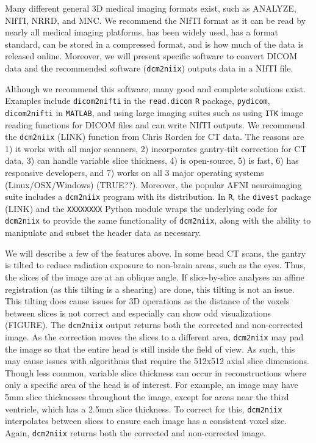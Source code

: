 \documentclass[]{elsarticle} %
\begin{document}
Many different general 3D medical imaging formats exist, such as
ANALYZE, NIfTI, NRRD, and MNC. We recommend the NIfTI format as it can
be read by nearly all medical imaging platforms, has been widely used,
has a format standard, can be stored in a compressed format, and is how
much of the data is released online. Moreover, we will present specific
software to convert DICOM data and the recommended software
(\texttt{dcm2niix}) outputs data in a NIfTI file.

Although we recommend this software, many good and complete solutions
exist. Examples include \texttt{dicom2nifti} in the \texttt{read.dicom}
\texttt{R} package, \texttt{pydicom}, \texttt{dicom2nifti} in
\texttt{MATLAB}, and using large imaging suites such as using
\texttt{ITK} image reading functions for DICOM files and can write NIfTI
outputs. We recommend the \texttt{dcm2niix} (LINK) function from Chris
Rorden for CT data. The reasons are 1) it works with all major scanners,
2) incorporates gantry-tilt correction for CT data, 3) can handle
variable slice thickness, 4) is open-source, 5) is fast, 6) has
responsive developers, and 7) works on all 3 major operating systems
(Linux/OSX/Windows) (TRUE??). Moreover, the popular AFNI neuroimaging
suite includes a \texttt{dcm2niix} program with its distribution. In
\texttt{R}, the \texttt{divest} package (LINK) and the \texttt{XXXXXXXX}
Python module wraps the underlying code for \texttt{dcm2niix} to provide
the same functionality of \texttt{dcm2niix}, along with the ability to
manipulate and subset the header data as necessary.

We will describe a few of the features above. In some head CT scans, the
gantry is tilted to reduce radiation exposure to non-brain areas, such
as the eyes. Thus, the slices of the image are at an oblique angle. If
slice-by-slice analyses an affine registration (as this tilting is a
shearing) are done, this tilting is not an issue. This tilting does
cause issues for 3D operations as the distance of the voxels between
slices is not correct and especially can show odd visualizations
(FIGURE). The \texttt{dcm2niix} output returns both the corrected and
non-corrected image. As the correction moves the slices to a different
area, \texttt{dcm2niix} may pad the image so that the entire head is
still inside the field of view. As such, this may cause issues with
algorithms that require the 512x512 axial slice dimensions. Though less
common, variable slice thickness can occur in reconstructions where only
a specific area of the head is of interest. For example, an image may
have 5mm slice thicknesses throughout the image, except for areas near
the third ventricle, which has a 2.5mm slice thickness. To correct for
this, \texttt{dcm2niix} interpolates between slices to ensure each image
has a consistent voxel size. Again, \texttt{dcm2niix} returns both the
corrected and non-corrected image.
\end{document}
